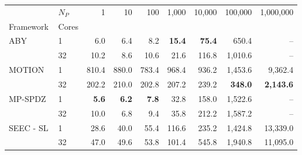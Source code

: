 \begin{tabular}{llrrrrrrr}
\toprule
 & $N_P$ & 1 & 10 & 100 & 1,000 & 10,000 & 100,000 & 1,000,000 \\
Framework & Cores &  &  &  &  &  &  &  \\
\midrule
\multirow[c]{2}{*}{ABY~\cite{DSZ15}} & 1 & 6.0 & 6.4 & 8.2 & \bfseries 15.4 & \bfseries 75.4 & 650.4 & -- \\
 & 32 & 10.2 & 8.6 & 10.6 & 21.6 & 116.8 & 1,010.6 & -- \\
\cline{1-9}
\multirow[c]{2}{*}{MOTION~\cite{BDST22}} & 1 & 810.4 & 880.0 & 783.4 & 968.4 & 936.2 & 1,453.6 & 9,362.4 \\
 & 32 & 202.2 & 210.0 & 202.8 & 207.2 & 239.2 & \bfseries 348.0 & \bfseries 2,143.6 \\
\cline{1-9}
\multirow[c]{2}{*}{MP-SPDZ~\cite{CCS:Keller20}} & 1 & \bfseries 5.6 & \bfseries 6.2 & \bfseries 7.8 & 32.8 & 158.0 & 1,522.6 & -- \\
 & 32 & 10.0 & 6.8 & 9.4 & 35.8 & 212.2 & 1,587.2 & -- \\
\cline{1-9}
\multirow[c]{2}{*}{SEEC - SL} & 1 & 28.6 & 40.0 & 55.4 & 116.6 & 235.2 & 1,424.8 & 13,339.0 \\
 & 32 & 47.0 & 49.6 & 53.8 & 101.4 & 545.8 & 1,940.8 & 11,095.0 \\
\bottomrule
\end{tabular}
